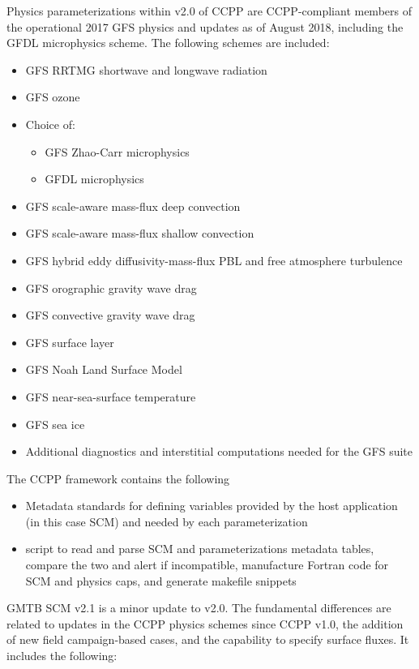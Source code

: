Physics parameterizations within v2.0 of CCPP are CCPP-compliant members of the operational 2017 GFS physics and updates as of August 2018, including the GFDL microphysics scheme. The following schemes are included:
\begin{itemize}
	\item GFS RRTMG shortwave and longwave radiation
	\item GFS ozone
	\item Choice of:
	\begin{itemize}
	\item GFS Zhao-Carr microphysics
	\item GFDL microphysics
	\end{itemize}
	\item GFS scale-aware mass-flux deep convection
	\item GFS scale-aware mass-flux shallow convection
	\item GFS hybrid eddy diffusivity-mass-flux PBL and free atmosphere turbulence
	\item GFS orographic gravity wave drag
	\item GFS convective gravity wave drag
	\item GFS surface layer
	\item GFS Noah Land Surface Model
	\item GFS near-sea-surface temperature
	\item GFS sea ice
	\item Additional diagnostics and interstitial computations needed for the GFS suite
\end{itemize}

The CCPP framework contains the following
\begin{itemize}
\item Metadata standards for defining variables provided by the host application (in this case SCM) and needed by each parameterization
\item {} script to read and parse SCM and parameterizations metadata tables, compare the two and alert if incompatible, manufacture Fortran code for SCM and physics caps, and generate makefile snippets
\end{itemize}

GMTB SCM v2.1 is a minor update to v2.0. The fundamental differences are related to updates in the CCPP physics schemes since CCPP v1.0, the addition of new field campaign-based cases, and the capability to specify surface fluxes. It includes the following:

